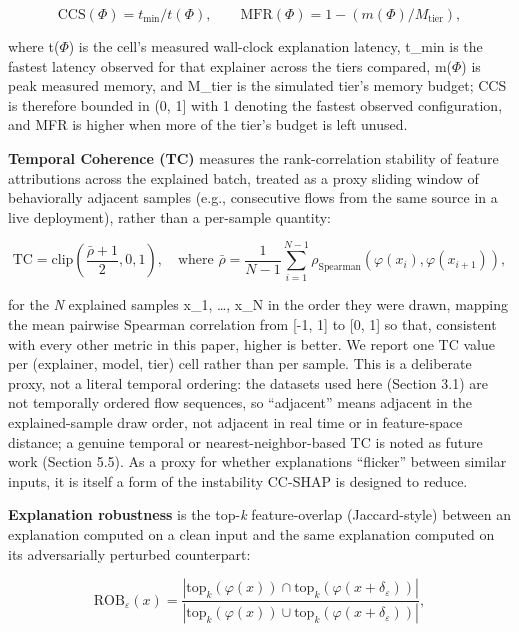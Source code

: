 \begin{equation}\mathrm{CCS}(\Phi) = t_{\min} / t(\Phi), \qquad \mathrm{MFR}(\Phi) = 1 - \left( m(\Phi) / M_{\mathrm{tier}} \right),\end{equation}

where t($\Phi$) is the cell's measured wall-clock explanation latency, t\_min is the fastest latency observed for that explainer across the tiers compared, m($\Phi$) is peak measured memory, and M\_tier is the simulated tier's memory budget; CCS is therefore bounded in (0, 1{]} with 1 denoting the fastest observed configuration, and MFR is higher when more of the tier's budget is left unused.

\textbf{Temporal Coherence (TC)} measures the rank-correlation stability of feature attributions across the explained batch, treated as a proxy sliding window of behaviorally adjacent samples (e.g., consecutive flows from the same source in a live deployment), rather than a per-sample quantity:

\begin{equation}\mathrm{TC} = \mathrm{clip}\!\left( \frac{\bar\rho + 1}{2}, 0, 1 \right), \quad \text{where } \bar\rho = \frac{1}{N-1} \sum_{i=1}^{N-1} \rho_{\mathrm{Spearman}}\!\left( \varphi(x_i), \varphi(x_{i+1}) \right),\end{equation}

for the \emph{N} explained samples x\_1, \ldots{}, x\_N in the order they were drawn, mapping the mean pairwise Spearman correlation from {[}-1, 1{]} to {[}0, 1{]} so that, consistent with every other metric in this paper, higher is better. We report one TC value per (explainer, model, tier) cell rather than per sample. This is a deliberate proxy, not a literal temporal ordering: the datasets used here (Section 3.1) are not temporally ordered flow sequences, so ``adjacent'' means adjacent in the explained-sample draw order, not adjacent in real time or in feature-space distance; a genuine temporal or nearest-neighbor-based TC is noted as future work (Section 5.5). As a proxy for whether explanations ``flicker'' between similar inputs, it is itself a form of the instability CC-SHAP is designed to reduce.

\textbf{Explanation robustness} is the top-\emph{k} feature-overlap (Jaccard-style) between an explanation computed on a clean input and the same explanation computed on its adversarially perturbed counterpart:

\begin{equation}\mathrm{ROB}_\varepsilon(x) = \frac{\left| \mathrm{top}_k(\varphi(x)) \cap \mathrm{top}_k(\varphi(x+\delta_\varepsilon)) \right|}{\left| \mathrm{top}_k(\varphi(x)) \cup \mathrm{top}_k(\varphi(x+\delta_\varepsilon)) \right|},\end{equation}

